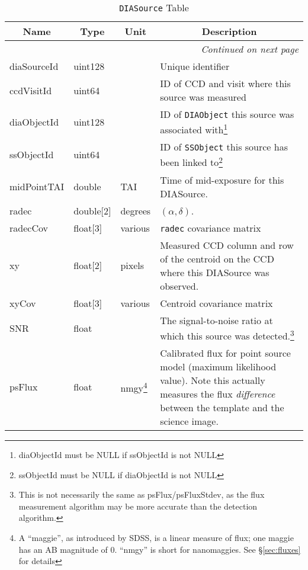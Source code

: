 \documentclass[12pt]{article}
\newcommand{\code}[1]{\texttt{#1}}
\newcommand{\DIASource}{\code{DIASource}\xspace}
\newcommand{\DIAObject}{\code{DIAObject}\xspace}
\newcommand{\SSObject}{\code{SSObject}\xspace}
\begin{document}
\begin{center}
\begin{longtable}{p{3cm}p{2cm}p{2cm}p{5cm}}
\caption[\DIASource Table]{\DIASource Table} \\

\hline \multicolumn{1}{c}{\bf Name} & \multicolumn{1}{c}{\bf Type} & \multicolumn{1}{c}{\bf Unit} & \multicolumn{1}{c}{\bf Description} \\ \hline
\endhead

\hline \multicolumn{4}{r}{{\em Continued on next page}} \\
\endfoot

\hline\hline
\endlastfoot

diaSourceId & uint128 & ~ & Unique identifier \\ 

ccdVisitId & uint64 & ~ & ID of CCD and visit where this source was measured \\ 

diaObjectId & uint128 & ~ & ID of \DIAObject this source was associated with\footnote{diaObjectId must be NULL if ssObjectId is not NULL} \\ 

ssObjectId & uint64 & ~ & ID of \SSObject this source has been linked to\footnote{ssObjectId must be NULL if diaObjectId is not NULL} \\ 

midPointTAI & double & TAI & Time of mid-exposure for this DIASource. \\ 

radec & double[2] & degrees & $(\alpha, \delta)$. \\ 

radecCov & float[3] & various & \texttt{radec} covariance matrix \\ 

xy & float[2] & pixels & Measured CCD column and row of the centroid on the CCD where this DIASource was observed. \\ 

xyCov & float[3] & various & Centroid covariance matrix \\ 

SNR & float & ~ & The signal-to-noise ratio at which this source was detected.\footnote{This is not necessarily the same as psFlux/psFluxStdev, as the flux measurement algorithm may be more accurate than the detection algorithm.} \\

psFlux & float & nmgy\footnote{A ``maggie'', as introduced by SDSS, is a linear measure of flux; one maggie has an AB magnitude of 0. ``nmgy'' is short for nanomaggies. See \S \ref{sec:fluxes} for details} & Calibrated flux for point source model (maximum likelihood value). Note this actually measures the flux {\em difference} between the template and the science image. \\ 


\end{longtable}
\end{center}
\end{document}
